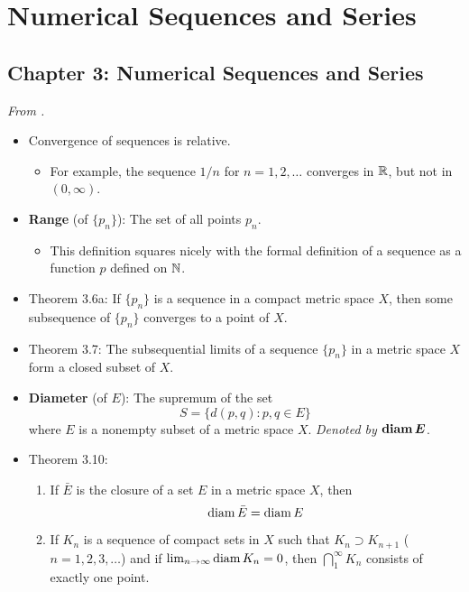 \documentclass[../../notes.tex]{subfiles}
\begin{document}
\chapter{Numerical Sequences and Series}
\section{Chapter 3: Numerical Sequences and Series}
\emph{From \textcite{bib:Rudin}.}
\begin{itemize}
    \item {}Convergence of sequences is relative.
    \begin{itemize}
        \item For example, the sequence $1/n$ for $n=1,2,\dots$ converges in $\mathbb{R}$, but not in $(0,\infty)$.
    \end{itemize}
    \item \textbf{Range} (of $\{p_n\}$): The set of all points $p_n$.
    \begin{itemize}
        \item This definition squares nicely with the formal definition of a sequence as a function $p$ defined on $\mathbb{N}$.
    \end{itemize}
    \item Theorem 3.6a: If $\{p_n\}$ is a sequence in a compact metric space $X$, then some subsequence of $\{p_n\}$ converges to a point of $X$.
    \item Theorem 3.7: The subsequential limits of a sequence $\{p_n\}$ in a metric space $X$ form a closed subset of $X$.
    \item \textbf{Diameter} (of $E$): The supremum of the set
    \begin{equation*}
        S = \{d(p,q):p,q\in E\}
    \end{equation*}
    where $E$ is a nonempty subset of a metric space $X$. \emph{Denoted by} $\bm{\diam E}$.
    \item Theorem 3.10:
    \begin{enumerate}[label={(\alph*)}]
        \item If $\bar{E}$ is the closure of a set $E$ in a metric space $X$, then
        \begin{equation*}
            \operatorname{diam}\bar{E} = \operatorname{diam} E
        \end{equation*}
        \item If $K_n$ is a sequence of compact sets in $X$ such that $K_n\supset K_{n+1}$ ($n=1,2,3,\dots$) and if $\lim_{n\to\infty}\operatorname{diam} K_n=0$, then $\bigcap_1^\infty K_n$ consists of exactly one point.

\end{enumerate}
\end{itemize}
\end{document}
